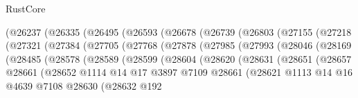 \begin{lexlean}{RustCore}
\begin{coremodule}
              (@26237
                (@26335
                  (@26495
                    (@26593
                      (@26678
                        (@26739
                          (@26803
                            (@27155
                              (@27218
                                (@27321
                                  (@27384
                                    (@27705
                                      (@27768
                                        (@27878
                                          (@27985
                                            (@27993
                                              (@28046
                                                (@28169
                                                  (@28485
                                                    (@28578
                                                      (@28589
                                                        (@28599
                                                          (@28604
                                                            (@28620
                                                              (@28631
                                                                (@28651
                                                                  (@28657
                                                                    @28661
                                                                    (@28652
                                                                      @1114
                                                                      @14
                                                                      @17
                                                                      @3897
                                                                      @7109
                                                                      @28661
                                                                      (@28621
                                                                        @1113
                                                                        @14
                                                                        @16
                                                                        @4639
                                                                        @7108
                                                                        @28630
                                                                        (@28632
                                                                          @192

\end{coremodule}
\end{lexlean}
